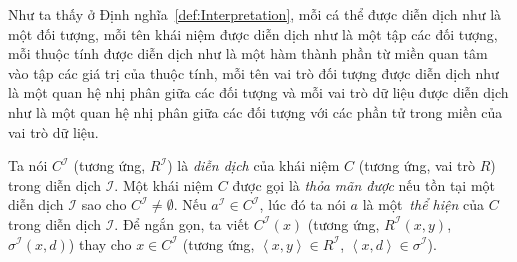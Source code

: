 \documentclass[12pt,a4paper,twoside]{report}
\newcommand{\mI}		{\mathcal{I}}
\newcommand{\tuple}[1]	{\left\langle#1\right\rangle\!}
\theoremstyle{definition}
\begin{document}
Như ta thấy ở Định nghĩa~\ref{def:Interpretation}, mỗi cá thể được diễn dịch như là một đối tượng, mỗi tên khái niệm được diễn dịch như là một tập các đối tượng, mỗi thuộc tính được diễn dịch như là một hàm thành phần từ miền quan tâm vào tập các giá trị của thuộc tính, mỗi tên vai trò đối tượng được diễn dịch như là một quan hệ nhị phân  giữa các đối tượng và mỗi vai trò dữ liệu được diễn dịch như là một quan hệ nhị phân giữa các đối tượng với các phần tử trong miền của vai trò dữ liệu.

Ta nói $C^\mI$ (tương ứng, $R^\mI$) là {\em diễn dịch} của khái niệm $C$ (tương ứng, vai trò $R$) trong diễn dịch $\mI$.
%
Một khái niệm $C$ được gọi là {\em thỏa mãn được} nếu tồn tại một diễn dịch $\mI$ sao cho $C^\mI \not= \emptyset$.
%
Nếu $a^\mI \in C^\mI$, lúc đó ta nói $a$ là một~{\em thể hiện} của $C$ trong diễn dịch $\mI$. Để ngắn gọn, ta viết $C^\mI(x)$ (tương ứng, $R^\mI(x,y)$, $\sigma^\mI(x, d)$) thay cho $x \in C^\mI$ (tương ứng, $\tuple{x, y} \in R^\mI$, $\tuple{x, d} \in \sigma^\mI$).
\end{document}
